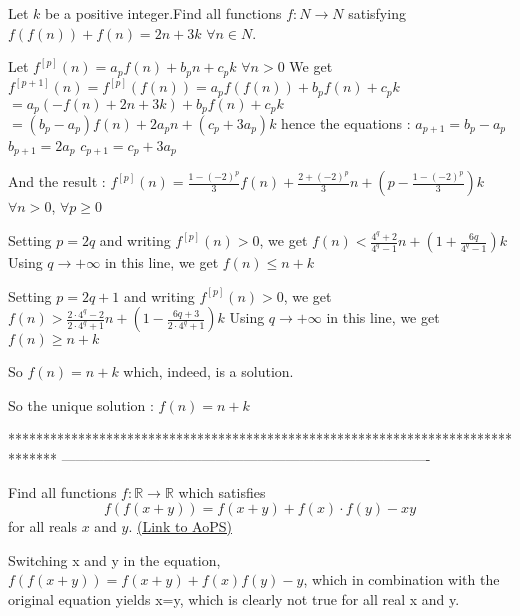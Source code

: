 \begin{solution}
	\begin{tcolorbox}Let $ k$ be a positive integer.Find all functions $ f: N \to N$ satisfying $ f(f(n)) + f(n) = 2n + 3k$ $ \forall n \in N$.\end{tcolorbox}

Let $ f^{[p]}(n) = a_pf(n) + b_pn + c_pk$ $ \forall n > 0$
We get $ f^{[p + 1]}(n) = f^{[p]}(f(n)) = a_pf(f(n)) + b_pf(n) + c_pk$ $ = a_p( - f(n) + 2n + 3k) + b_pf(n) + c_pk$ $ = (b_p - a_p)f(n) + 2a_pn + (c_p + 3a_p)k$
 hence the equations :
$ a_{p + 1} = b_p - a_p$
$ b_{p + 1} = 2a_p$
$ c_{p + 1} = c_p + 3a_p$

And the result : $ f^{[p]}(n) = \frac {1 - ( - 2)^p}3f(n) + \frac {2 + ( - 2)^p}3n + (p - \frac {1 - ( - 2)^p}3)k$ $ \forall n > 0$, $ \forall p\geq 0$

Setting $ p = 2q$ and writing $ f^{[p]}(n) > 0$, we get $ f(n) < \frac {4^q + 2}{4^q - 1}n + (1 + \frac {6q}{4^q - 1})k$
Using $ q\to + \infty$ in this line, we get $ f(n)\leq n + k$

Setting $ p = 2q + 1$ and writing $ f^{[p]}(n) > 0$, we get $ f(n) > \frac {2\cdot 4^q - 2}{2\cdot 4^q + 1}n + (1 - \frac {6q + 3}{2\cdot 4^q + 1})k$
Using $ q\to + \infty$ in this line, we get $ f(n)\geq n + k$

So $ f(n) = n + k$ which, indeed, is a solution.

So the unique solution : $ \boxed{f(n) = n + k}$
\end{solution}
*******************************************************************************
-------------------------------------------------------------------------------

\begin{problem}
	Find all functions $f: \mathbb R \to \mathbb R$ which satisfies
\[f(f(x+y))=f(x+y)+f(x) \cdot f(y)-xy\]
for all reals $x$ and $y$.
	\flushright \href{https://artofproblemsolving.com/community/c6h308263}{(Link to AoPS)}
\end{problem}



\begin{solution}
	Switching x and y in the equation, $ f(f(x+y))=f(x+y)+f(x)f(y)-y$, which in combination with the original equation yields x=y, which is clearly not true for all real x and y.
\end{solution}



